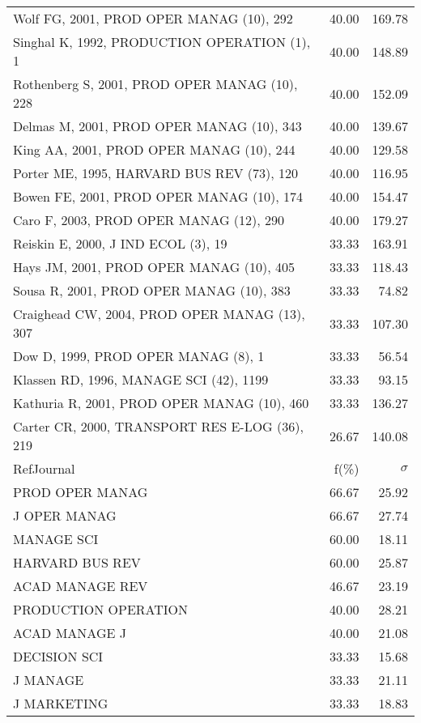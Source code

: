 \documentclass[a4paper,11pt]{report}
\begin{document}
\begin{landscape}
\begin{table}[!ht]
{\begin{tabular}{|l r r|}
Wolf FG, 2001, PROD OPER MANAG (10), 292 & 40.00 & 169.78\\
Singhal K, 1992, PRODUCTION OPERATION (1), 1 & 40.00 & 148.89\\
Rothenberg S, 2001, PROD OPER MANAG (10), 228 & 40.00 & 152.09\\
Delmas M, 2001, PROD OPER MANAG (10), 343 & 40.00 & 139.67\\
King AA, 2001, PROD OPER MANAG (10), 244 & 40.00 & 129.58\\
Porter ME, 1995, HARVARD BUS REV (73), 120 & 40.00 & 116.95\\
Bowen FE, 2001, PROD OPER MANAG (10), 174 & 40.00 & 154.47\\
Caro F, 2003, PROD OPER MANAG (12), 290 & 40.00 & 179.27\\
Reiskin E, 2000, J IND ECOL (3), 19 & 33.33 & 163.91\\
Hays JM, 2001, PROD OPER MANAG (10), 405 & 33.33 & 118.43\\
Sousa R, 2001, PROD OPER MANAG (10), 383 & 33.33 & 74.82\\
Craighead CW, 2004, PROD OPER MANAG (13), 307 & 33.33 & 107.30\\
Dow D, 1999, PROD OPER MANAG (8), 1 & 33.33 & 56.54\\
Klassen RD, 1996, MANAGE SCI (42), 1199 & 33.33 & 93.15\\
Kathuria R, 2001, PROD OPER MANAG (10), 460 & 33.33 & 136.27\\
Carter CR, 2000, TRANSPORT RES E-LOG (36), 219 & 26.67 & 140.08\\
\hline
\hline
RefJournal & f(\%) & $\sigma$\\
\hline
PROD OPER MANAG & 66.67 & 25.92\\
J OPER MANAG & 66.67 & 27.74\\
MANAGE SCI & 60.00 & 18.11\\
HARVARD BUS REV & 60.00 & 25.87\\
ACAD MANAGE REV & 46.67 & 23.19\\
PRODUCTION OPERATION & 40.00 & 28.21\\
ACAD MANAGE J & 40.00 & 21.08\\
DECISION SCI & 33.33 & 15.68\\
J MANAGE & 33.33 & 21.11\\
J MARKETING & 33.33 & 18.83\\
\hline
\end{tabular}
}
\end{table}

\end{landscape}
\end{document}
